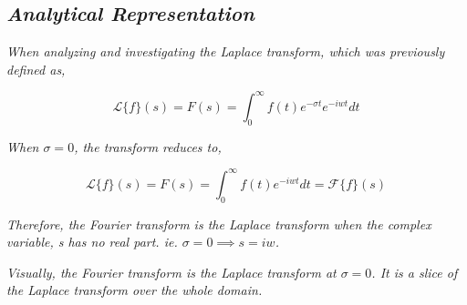 

\subsection{\textit{Analytical Representation}}

	\textit{When analyzing and investigating the Laplace transform, which was previously defined as,}
	
		$$\mathcal{L}\{f\}(s) = F(s) = \int_0^{\infty}f(t)e^{-\sigma t}e^{-iwt} dt$$	
	
	\textit{When $\sigma = 0$, the transform reduces to,}	
	
		$$\mathcal{L}\{f\}(s) = F(s) = \int_0^{\infty}f(t)e^{-iwt} dt = \mathcal{F}\{f\}(s)$$

	\textit{Therefore, the Fourier transform is the Laplace transform when the complex variable, s has no real part. ie. $\sigma = 0 \implies s = iw$.}

	\textit{Visually, the Fourier transform is the Laplace transform at $\sigma = 0$. It is a slice of the Laplace transform over the whole domain.}



